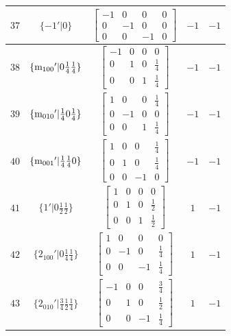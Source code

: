 \documentclass[fleqn,8pt]{jsarticle}
\begin{document}
\begin{longtable}{ccccc}
$ 37 $ & $ \{-1{}'|0\} $ & $ \begin{bmatrix} -1 & 0 & 0 & 0 \\ 0 & -1 & 0 & 0 \\ 0 & 0 & -1 & 0 \end{bmatrix} $ & $ -1 $ & $ -1 $ \\ \hline
$ 38 $ & $ \{{\rm m}_{100}{}'|0 \frac{1}{4} \frac{1}{4}\} $ & $ \begin{bmatrix} -1 & 0 & 0 & 0 \\ 0 & 1 & 0 & \frac{1}{4} \\ 0 & 0 & 1 & \frac{1}{4} \end{bmatrix} $ & $ -1 $ & $ -1 $ \\ \hline
$ 39 $ & $ \{{\rm m}_{010}{}'|\frac{1}{4} 0 \frac{1}{4}\} $ & $ \begin{bmatrix} 1 & 0 & 0 & \frac{1}{4} \\ 0 & -1 & 0 & 0 \\ 0 & 0 & 1 & \frac{1}{4} \end{bmatrix} $ & $ -1 $ & $ -1 $ \\ \hline
$ 40 $ & $ \{{\rm m}_{001}{}'|\frac{1}{4} \frac{1}{4} 0\} $ & $ \begin{bmatrix} 1 & 0 & 0 & \frac{1}{4} \\ 0 & 1 & 0 & \frac{1}{4} \\ 0 & 0 & -1 & 0 \end{bmatrix} $ & $ -1 $ & $ -1 $ \\ \hline
$ 41 $ & $ \{1{}'|0 \frac{1}{2} \frac{1}{2}\} $ & $ \begin{bmatrix} 1 & 0 & 0 & 0 \\ 0 & 1 & 0 & \frac{1}{2} \\ 0 & 0 & 1 & \frac{1}{2} \end{bmatrix} $ & $ 1 $ & $ -1 $ \\ \hline
$ 42 $ & $ \{2{}_{100}{}'|0 \frac{1}{4} \frac{1}{4}\} $ & $ \begin{bmatrix} 1 & 0 & 0 & 0 \\ 0 & -1 & 0 & \frac{1}{4} \\ 0 & 0 & -1 & \frac{1}{4} \end{bmatrix} $ & $ 1 $ & $ -1 $ \\ \hline
$ 43 $ & $ \{2{}_{010}{}'|\frac{3}{4} \frac{1}{2} \frac{1}{4}\} $ & $ \begin{bmatrix} -1 & 0 & 0 & \frac{3}{4} \\ 0 & 1 & 0 & \frac{1}{2} \\ 0 & 0 & -1 & \frac{1}{4} \end{bmatrix} $ & $ 1 $ & $ -1 $ \\ \hline

\end{longtable}
\end{document}
